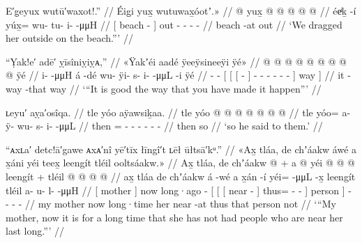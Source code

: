 \ex\label{ex:92-144-drag-out-to-beach}%
%
\begingl
	\glpreamble	E′g̣eyux wutū′waxot!.” //
	\glpreamble	Éig̱i yux̱ wutuwax̱óotʼ.\!» //
	\gla	{}  @ {} {}
		yux̱ @  @ {} @ {} @ {} @ {} //
	\glb	{} éeͥḵ -í {}
		yúx̱= wu- tu- i-  -μμH //
	\glc	{}[ beach - {}]
		out - - -  - //
	\gld	{} beach -at {}
		out  {} {} {} {} //
	\glft	‘We dragged her outside on the beach.”’
		//
\endgl
\xe

\ex\label{ex:92-145-it-is-good-you-have-done}%
%
\begingl
	\glpreamble	“Ỵak!e′ adē′ ỵīsîniỵiỵᴀ,” //
	\glpreamble	«\!Ÿakʼéi aadé ÿeeÿsineeÿi ÿé\!» //
	\gla	{} @ {} @ {}
		{} {} {}  @ {} {}
			 @ {} @ {} @ {} @ {} @ {} @ {} {} ÿé {} //
	\glb	\pqp{}i-  -μμH
		{} {} {} á -dé {}
			wu- ÿi- s- i-  -μμL -i {} ÿé {} //
	\glc	\pqp{}-  -
		{}[ {}[ {}[  - {}]
			- - - -
				 - - {}] way {}] //
	\gld	\pqp{} {} {}
		{} {} {} it -way {}
			 {} {} {} {} {} -that
			{} way {}  //
	\glft	‘“It is good the way that you have made it happen”’
		//
\endgl
\xe

\ex\label{ex:92-146-so-said-to-them}%
%
\begingl
	\glpreamble	ʟeyu′ aỵa′osîqa. //
	\glpreamble	tle yóo aÿawsiḵaa. //
	\gla	tle yóo @  @ {} @ {} @ {} @ {} @ {} @ {} //
	\glb	tle yóo= a- ÿ- wu- s- i-  -μμL //
	\glc	then = - - - - -
			 - //
	\gld	then so  {} {} {} {} {} {} //
	\glft	‘so he said to them.’
		//
\endgl
\xe

\ex\label{ex:92-147-doesnt-make-last}%
%
\begingl
	\glpreamble	“ᴀxʟa′ detc!ā′gawe ᴀxᴀ′nî yē′tīx łīngî′t ʟēł ūłtsā′kᵘ.” //
	\glpreamble	«\!Ax̱ tláa, de chʼáakw áwé a x̱áni yéi teex̱ leengít tléil ooltsáakw.\!» //
	\gla	{} Ax̱ tláa, {} de chʼáakw  @ {} +
		{} {} {} a  @ {} {}
			yéi @  @ {} @ {} {} {} leengít {} +
		tléil  @ {} @ {} @ {} @ {} //
	\glb	{} ax̱ tláa {} de chʼáakw á -wé
		{} {} {} a x̱án -í {} 
			yéi=  -μμL -x̱ {} {} leengít {}
		tléil a- u- l-  -μμH //
	\glc	{}[  mother {}] now long·ago  -
		{}[ {}[ {}[  near - {}]
			thus=  - - \quad{}\· {}]
			person {}]
		 - - -  - //
	\gld	{} my mother {} now long·time  {}
		{} {} {} her near -at {}
			thus  {} {} \quad{}\·that {}
			person {}
		not  {} {} {} {} //
	\glft	‘“My mother, now it is for a long time that she has not had people who are near her last long.”’
		//
\endgl
\xe

